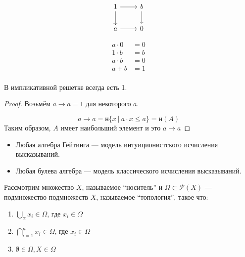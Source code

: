 \documentclass[12pt, a4paper, oneside]{book}
\begin{document}
\begin{example}
    $$\begin{tikzcd}[ampersand replacement=\&]
            1 \arrow{r} \arrow[swap]{d}{} \& b \arrow{d}{} \\
            a \arrow{r} \& 0
        \end{tikzcd}$$

    \begin{align*}
        a\cdot 0 & = 0 \\
        1\cdot b & = b \\
        a\cdot b & = 0 \\
        a + b    & = 1 \\
    \end{align*}
\end{example}

\begin{lemma}
    В импликативной решетке всегда есть 1.
\end{lemma}
\begin{proof}
    Возьмём \(a \to a = 1\) для некоторого \(a\).

    \[a \to a = \text{н} \{x\ |\ a\cdot x \leq a\} = \text{н}(A)\]
    Таким образом, \(A\) имеет наибольший элемент и это \(a \to a\)
\end{proof}

\begin{theorem}\itemfix
    \begin{itemize}
        \item Любая алгебра Гейтинга --- модель интуиционистского исчисления высказываний.
        \item Любая булева алгебра --- модель классического исчисления высказываний.
    \end{itemize}
\end{theorem}

\begin{definition}[топология]
    Рассмотрим множество \(X\), называемое ``носитель'' и \(\Omega \subset \mathcal{P}(X)\) --- подмножество подмножеств \(X\), называемое ``топология'', такое что:
    \begin{enumerate}
        \item \(\bigcup_\alpha x_i \in \Omega\), где \(x_i\in\Omega\)
        \item \(\bigcap_{i = 1}^{n} x_i \in \Omega\), где \(x_i\in\Omega\)
        \item \(\emptyset\in\Omega, X\in \Omega\)
    \end{enumerate}
\end{definition}
\end{document}
